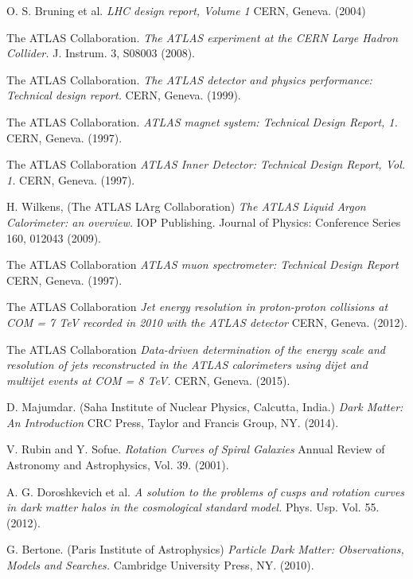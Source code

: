 \begin{thebibliography}{9}

O. S. Bruning et al. 
\textit{LHC design report, Volume 1}
CERN, Geneva. (2004)

The ATLAS Collaboration.
\textit{The ATLAS experiment at the CERN Large Hadron Collider.}
J. Instrum. 3, S08003 (2008).

The ATLAS Collaboration.
\textit{The ATLAS detector and physics performance: Technical design report.}
CERN, Geneva. (1999).

The ATLAS Collaboration.
\textit{ATLAS magnet system: Technical Design Report, 1.}
CERN, Geneva. (1997).

The ATLAS Collaboration
\textit{ATLAS Inner Detector: Technical Design Report, Vol. 1.}
CERN, Geneva. (1997).

H. Wilkens, (The ATLAS LArg Collaboration)
\textit{The ATLAS Liquid Argon Calorimeter: an overview.}
IOP Publishing. Journal of Physics: Conference Series 160, 012043 (2009).

The ATLAS Collaboration
\textit{ATLAS muon spectrometer: Technical Design Report}
CERN, Geneva. (1997).

The ATLAS Collaboration
\textit{Jet energy resolution in proton-proton collisions at COM = 7 TeV recorded in 2010 with the ATLAS detector}
CERN, Geneva. (2012).

The ATLAS Collaboration
\textit{Data-driven determination of the energy scale and resolution of jets reconstructed in the ATLAS calorimeters using dijet and multijet events at COM = 8 TeV.}
CERN, Geneva. (2015).

D. Majumdar. (Saha Institute of Nuclear Physics, Calcutta, India.)
\textit{Dark Matter: An Introduction}
CRC Press, Taylor and Francis Group, NY. (2014).

V. Rubin and Y. Sofue.
\textit{Rotation Curves of Spiral Galaxies}
Annual Review of Astronomy and Astrophysics, Vol. 39. (2001).

A. G. Doroshkevich et al. 
\textit{A solution to the problems of cusps and rotation curves in dark matter halos in the cosmological standard model.}
Phys. Usp. Vol. 55. (2012).

G. Bertone. (Paris Institute of Astrophysics)
\textit{Particle Dark Matter: Observations, Models and Searches.}
 Cambridge University Press, NY. (2010).


\end{thebibliography}
